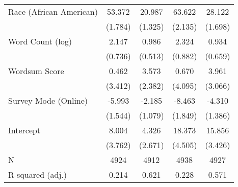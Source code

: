 \begin{table}[h]
\begin{tabular}{lcccc}
  Race (African American) &  53.372 &  20.987 &  63.622 &  28.122 \\ 
   & (1.784) & (1.325) & (2.135) & (1.698) \\ 
  Word Count (log) &   2.147 &   0.986 &   2.324 &   0.934 \\ 
   & (0.736) & (0.513) & (0.882) & (0.659) \\ 
  Wordsum Score &   0.462 &   3.573 &   0.670 &   3.961 \\ 
   & (3.412) & (2.382) & (4.095) & (3.066) \\ 
  Survey Mode (Online) &  -5.993 &  -2.185 &  -8.463 &  -4.310 \\ 
   & (1.544) & (1.079) & (1.849) & (1.386) \\ 
  Intercept &   8.004 &   4.326 &  18.373 &  15.856 \\ 
   & (3.762) & (2.671) & (4.505) & (3.426) \\ 
   \hline
N & 4924 & 4912 & 4938 & 4927 \\ 
  R-squared (adj.) & 0.214 & 0.621 & 0.228 & 0.571 \\ 
   \hline
\end{tabular}
\endgroup
\end{table}
